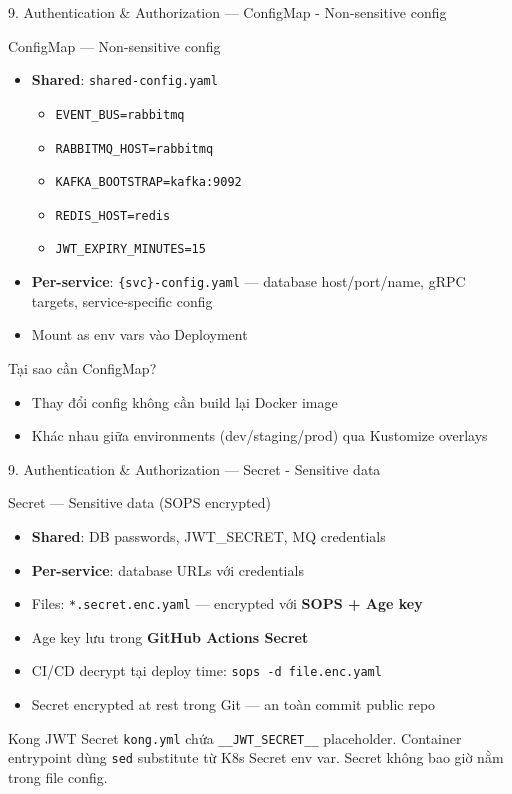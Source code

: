 \documentclass[aspectratio=169,compress]{beamer}
\begin{document}
\begin{frame}{9. Authentication \& Authorization --- ConfigMap - Non-sensitive config}
\begin{block}{ConfigMap --- Non-sensitive config}
\begin{itemize}
  \item \textbf{Shared}: \texttt{shared-config.yaml}
    \begin{itemize}
      \item \small \texttt{EVENT\_BUS=rabbitmq}
      \item \small \texttt{RABBITMQ\_HOST=rabbitmq}
      \item \small \texttt{KAFKA\_BOOTSTRAP=kafka:9092}
      \item \small \texttt{REDIS\_HOST=redis}
      \item \small \texttt{JWT\_EXPIRY\_MINUTES=15}
    \end{itemize}
  \item \textbf{Per-service}: \texttt{\{svc\}-config.yaml} --- database host/port/name, gRPC targets, service-specific config
  \item Mount as env vars vào Deployment
\end{itemize}
\end{block}
\begin{block}{Tại sao cần ConfigMap?}
\begin{itemize}
  \item Thay đổi config không cần build lại Docker image
  \item Khác nhau giữa environments (dev/staging/prod) qua Kustomize overlays
\end{itemize}
\end{block}
\end{frame}

\begin{frame}{9. Authentication \& Authorization --- Secret - Sensitive data}
\begin{block}{Secret --- Sensitive data (SOPS encrypted)}
\begin{itemize}
  \item \textbf{Shared}: DB passwords, JWT\_SECRET, MQ credentials
  \item \textbf{Per-service}: database URLs với credentials
  \item Files: \texttt{*.secret.enc.yaml} --- encrypted với \textbf{SOPS + Age key}
  \item Age key lưu trong \textbf{GitHub Actions Secret}
  \item CI/CD decrypt tại deploy time: \texttt{sops -d file.enc.yaml}
  \item Secret encrypted at rest trong Git --- an toàn commit public repo
\end{itemize}
\end{block}
\begin{block}{Kong JWT Secret}
\texttt{kong.yml} chứa \texttt{\_\_JWT\_SECRET\_\_} placeholder. Container entrypoint dùng \texttt{sed} substitute từ K8s Secret env var. Secret không bao giờ nằm trong file config.
\end{block}
\end{frame}
\end{document}
